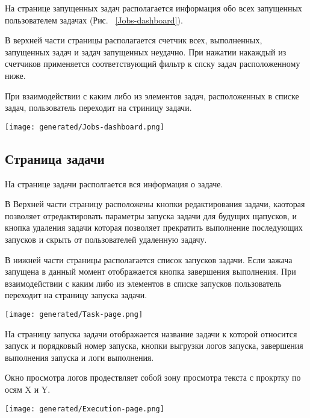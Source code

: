 На странице запущенных задач располагается информация обо всех запущенных пользователем задачах (Рис. ~\ref{Jobs-dashboard}).

В верхней части страницы располагается счетчик всех, выполненных, запущенных задач и задач запущенных неудачно.
При нажатии накаждый из счетчиков применяется соответствующий фильтр к спску задач расположенному ниже.

При взаимодействии с каким либо из элементов задач, расположенных в списке задач, пользователь переходит на стриницу задачи.

\begin{figure*}[!t]
  \centering
  \texttt{[image: generated/Jobs-dashboard.png]}
  \caption{Каркасный макет страницы запущенных задач}
  \label{Jobs-dashboard}
\end{figure*}

\subsection{Страница задачи}

На странице задачи располгается вся информация о задаче.

В Верхней части страницу расположены кнопки редактирования задачи, каоторая позволяет отредактировать параметры запуска задачи для будущих щапусков, и кнопка удаления задачи которая позволяет прекратить выполнение последующих запусков и скрыть от пользователей удаленную задачу.

В нижней части страницы располагается список запусков задачи. Если зажача запущена в данный момент отображается кнопка завершения выполнения. При взаимодействии с каким либо из элементов в списке запусков пользователь переходит на страницу запуска задачи.

\begin{figure*}[!t]
  \centering
  \texttt{[image: generated/Task-page.png]}
  \caption{Каркасный макет страницы просмотра запущенной задачи}
  \label{Task-page}
\end{figure*}

На страницу запуска задачи отображается название задачи к которой относится запуск и порядковый номер запуска, кнопки выгрузки логов запуска, завершения выполнения запуска и логи выполнения. 

Окно просмотра логов продествляет собой зону просмотра текста с прокртку по осям X и Y.

\begin{figure*}[!t]
  \centering
  \texttt{[image: generated/Execution-page.png]}
  \caption{Каркасный макет страницы просмотра запуска задачи}
  \label{Execution-page}
\end{figure*}

